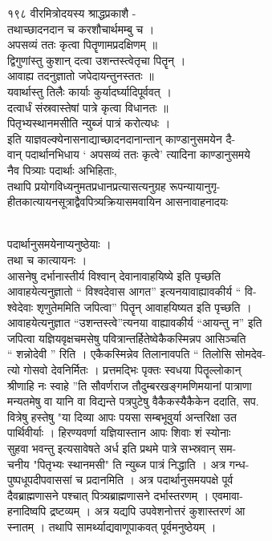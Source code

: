 \documentclass[11pt, openany]{book}
\begin{document}
{{{{{{{१९८ वीरमित्रोदयस्य श्राद्धप्रकाशै -}{\\
तथाच्छादनदान च करशौचार्थमम्बु च ।\\
अपसव्यं ततः कृत्वा पितॄणामप्रदक्षिणम् }{॥ }{\\
द्विगुणांस्तु कुशान् दत्वा उशन्तस्त्वेतृचा पितॄन् ।\\
आवाह्य तदनुज्ञातो जपेदायन्तुनस्ततः }{॥ }{\\
यवार्थास्तु तिलैः कार्याः कुर्यादर्घ्यादिपूर्ववत् ।\\
दत्वार्धं संस्रवास्तेषां पात्रे कृत्वा विधानतः ॥\\
पितृभ्यस्थानमसीति न्युब्जं पात्रं करोत्यधः ।\\
इति याज्ञवल्क्येनासनाद्याच्छादनदानान्तान् काण्डानुसमयेन दै-\\
वान् पदार्थानभिधाय ` अपसव्यं ततः कृत्वे' त्यादिना काण्डानुसमये\\
नैव पित्र्याः पदार्थाः अभिहिताः,\\
तथापि प्रयोगविध्यनुमतप्रधानप्रत्यासत्यनुग्रह रूपन्यायानुगृ-\\
हीतकात्यायनसूत्राद्वैवपित्र्यक्रियासमवायिन }{आसनावाहनादयः}{\\
पदार्थानुसमयेनाप्यनुष्ठेयाः ।\\
तथा च कात्यायनः ।\\
आसनेषु दर्भानास्तीर्य विश्वान् देवानावाहयिष्ये इति पृच्छति\\
आवाहयेत्यनुज्ञातो `` विश्वदेवास आगत'' इत्यनयावाह्यावकीर्य `` वि-\\
श्वेदेवाः शृणुतेममिति जपित्वा'' पितॄन् आवाहयिष्यत इति पृच्छति ।\\
आवाहयेत्यनुज्ञात ``उशन्तस्त्वे''त्यनया वाह्यावकीर्य ``आयन्तु न'' इति\\
जपित्वा यज्ञियवृक्षचमसेषु पवित्रान्तर्हितेष्वेकैकस्मिन्नप आसिञ्चति\\
`` शन्नोदेवी '' रिति । एकैकस्मिन्नेव तिलानावपति `` तिलोसि सोमदेव-\\
त्यो गोसवो देवनिर्मितः । प्रत्तमद्भिः पृक्तः स्वधया पितॄल्लोकान्\\
श्रीणाहि नः स्वाहे ''ति सौवर्णराज तौदुम्बरखङ्गमणिमयानां पात्राणा\\
मन्यतमेषु वा यानि वा विद्यन्ते पत्रपुटेषु वैकैकस्यैकैकेन ददाति, सप.\\
वित्रेषु हस्तेषु "या दिव्या आपः पयसा सम्बभूवुर्या अन्तरिक्षा उत\\
पार्थिवीर्याः । हिरण्यवर्णा यज्ञियास्तान आपः शिवाः शं स्योनाः\\
सुहवा भवन्तु इत्यसावेषते अर्ध इति प्रथमे पात्रे सभ्स्रवान् सम-\\
चनीय "पितृभ्यः स्थानमसी" ति न्युब्ज पात्रं निद्धाति । अत्र गन्ध-\\
पुष्पधूपदीपवाससां च प्रदानमिति । अत्र पदार्थानुसमयपक्षे पूर्व\\
दैवब्राह्मणासने पश्चात् पित्र्यब्राह्मणासने दर्भास्तरणम् । एवमावा-\\
हनादिष्वपि द्रष्टव्यम् । अत्र यद्यपि उपवेशनोत्तरं कुशास्तरणं आ\\
स्नातम् । तथापि सामर्थ्याद्यवाणूपाकवत् पूर्वमनुष्ठेयम् ।

}}}}}}}
\end{document}
